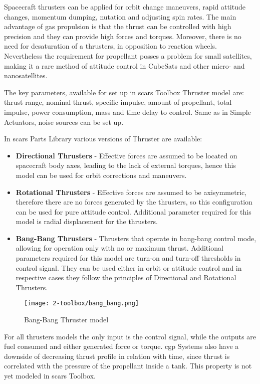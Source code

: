         Spacecraft thrusters can be applied for orbit change maneuvers, rapid attitude changes, momentum dumping, nutation and adjusting spin rates. The main advantage of gas propulsion is that the thrust can be controlled with high precision and they can provide high forces and torques. Moreover, there is no need for desaturation of a thrusters, in opposition to reaction wheels. Nevertheless the requirement for propellant posses a problem for small satellites, making it a rare method of attitude control in CubeSats and other micro- and nanosatellites. 
        
        The key parameters, available for set up in \ac{scars} Toolbox Thruster model are: thrust range, nominal thrust, specific impulse, amount of propellant, total impulse, power consumption, mass and time delay to control. Same as in Simple Actuators, noise sources can be set up.

        In \ac{scars} Parts Library various versions of Thruster are available:
        \begin{itemize}
            \item \textbf{Directional Thrusters} - Effective forces are assumed to be located on spacecraft body axes, leading to the lack of external torques, hence this model can be used for orbit corrections and maneuvers.
            \item \textbf{Rotational Thrusters} - Effective forces are assumed to be axisymmetric, therefore there are no forces generated by the thrusters, so this configuration can be used for pure attitude control. Additional parameter required for this model is radial displacement for the thrusters. 
            \item \textbf{Bang-Bang Thrusters} - Thrusters that operate in bang-bang control mode, allowing for operation only with no or maximum thrust. Additional parameters required for this model are turn-on and turn-off thresholds in control signal. They can be used either in orbit or attitude control and in respective cases they follow the principles of Directional and Rotational Thrusters.
        \end{itemize}

        \begin{figure}[H]
            \centering
            \texttt{[image: 2-toolbox/bang\_bang.png]}
            \caption{Bang-Bang Thruster model}
            \label{fig:bang_bang}
        \end{figure}


        For all thrusters models the only input is the control signal, while the outputs are fuel consumed and either generated force or torque. \ac{cgp} Systems also have a downside of decreasing thrust profile in relation with time, since thrust is correlated with the pressure of the propellant inside a tank. This property is not yet modeled in \ac{scars} Toolbox. %

